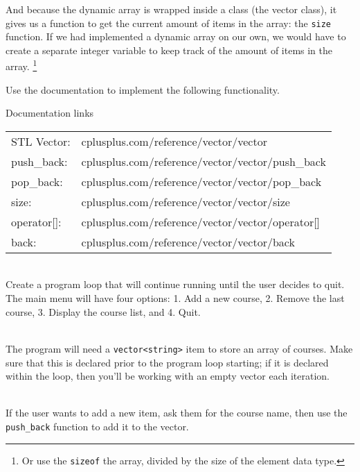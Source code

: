         And because the dynamic array is wrapped inside a class (the vector class),
        it gives us a function to get the current amount of items in the array: the \texttt{size} function.
        If we had implemented a dynamic array on our own, we would have to create a separate
        integer variable to keep track of the amount of items in the array.
        \footnote{Or use the \texttt{sizeof} the array, divided by the size of the element data type.}

        \newpage

        Use the documentation to implement the following functionality.
        
        \begin{hint}{Documentation links} ~\\
            \begin{tabular}{ l l }
                STL Vector: & cplusplus.com/reference/vector/vector \\
                push\_back: & cplusplus.com/reference/vector/vector/push\_back \\
                pop\_back:  & cplusplus.com/reference/vector/vector/pop\_back \\
                size:       & cplusplus.com/reference/vector/vector/size \\
                operator[]: & cplusplus.com/reference/vector/vector/operator[] \\
                back:       & cplusplus.com/reference/vector/vector/back
            \end{tabular}
        \end{hint}

        ~\\ Create a program loop that will continue running until the user decides to quit.
        The main menu will have four options: 1. Add a new course,
        2. Remove the last course, 3. Display the course list, and 4. Quit.

        ~\\ The program will need a \texttt{vector<string>} item to store an array of courses.
        Make sure that this is declared prior to the program loop starting; if it is declared
        within the loop, then you'll be working with an empty vector each iteration.

        ~\\ If the user wants to add a new item, ask them for the course name, then
        use the \texttt{push\_back} function to add it to the vector.

